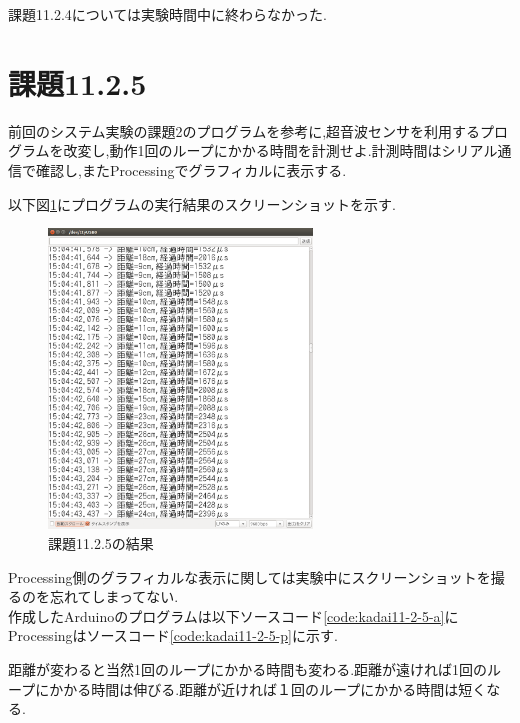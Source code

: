 \documentclass{jarticle}
\begin{document}
課題11.2.4については実験時間中に終わらなかった.

\section{課題11.2.5}
前回のシステム実験の課題2のプログラムを参考に,超音波センサを利用するプログラムを改変し,動作1回のループにかかる時間を計測せよ.計測時間はシリアル通信で確認し,またProcessingでグラフィカルに表示する.

以下図\ref{fig:kadai11-2-5}にプログラムの実行結果のスクリーンショットを示す.  

\begin{figure}[H]
\begin{center}
\includegraphics[width=7.0cm]{images/kadai11-2-5.png}
\caption{課題11.2.5の結果}
\label{fig:kadai11-2-5}
\end{center}
\end{figure}
Processing側のグラフィカルな表示に関しては実験中にスクリーンショットを撮るのを忘れてしまってない. \\
作成したArduinoのプログラムは以下ソースコード\ref{code:kadai11-2-5-a}に
Processingはソースコード\ref{code:kadai11-2-5-p}に示す.




距離が変わると当然1回のループにかかる時間も変わる.距離が遠ければ1回のループにかかる時間は伸びる.距離が近ければ１回のループにかかる時間は短くなる.
\end{document}
